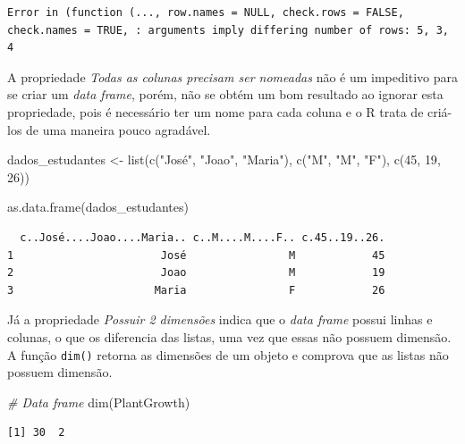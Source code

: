\documentclass[
  brazilian,
]{book}
\newenvironment{Shaded}{\begin{snugshade}}{\end{snugshade}}
\newcommand{\CommentTok}[1]{\textcolor[rgb]{0.56,0.35,0.01}{\textit{#1}}}
\newcommand{\DecValTok}[1]{\textcolor[rgb]{0.00,0.00,0.81}{#1}}
\newcommand{\FunctionTok}[1]{\textcolor[rgb]{0.00,0.00,0.00}{#1}}
\newcommand{\NormalTok}[1]{#1}
\newcommand{\OtherTok}[1]{\textcolor[rgb]{0.56,0.35,0.01}{#1}}
\newcommand{\StringTok}[1]{\textcolor[rgb]{0.31,0.60,0.02}{#1}}
\begin{document}
\begin{verbatim}
Error in (function (..., row.names = NULL, check.rows = FALSE, check.names = TRUE, : arguments imply differing number of rows: 5, 3, 4
\end{verbatim}

A propriedade \emph{Todas as colunas precisam ser nomeadas} não é um impeditivo para se criar um \emph{data frame}, porém, não se obtém um bom resultado ao ignorar esta propriedade, pois é necessário ter um nome para cada coluna e o R trata de criá-los de uma maneira pouco agradável.

\begin{Shaded}
\begin{Highlighting}[]
\NormalTok{dados\_estudantes }\OtherTok{\textless{}{-}} \FunctionTok{list}\NormalTok{(}\FunctionTok{c}\NormalTok{(}\StringTok{"José"}\NormalTok{, }\StringTok{"Joao"}\NormalTok{, }\StringTok{"Maria"}\NormalTok{),}
                         \FunctionTok{c}\NormalTok{(}\StringTok{"M"}\NormalTok{, }\StringTok{"M"}\NormalTok{, }\StringTok{"F"}\NormalTok{),}
                         \FunctionTok{c}\NormalTok{(}\DecValTok{45}\NormalTok{, }\DecValTok{19}\NormalTok{, }\DecValTok{26}\NormalTok{))}

\FunctionTok{as.data.frame}\NormalTok{(dados\_estudantes)}
\end{Highlighting}
\end{Shaded}

\begin{verbatim}
  c..José....Joao....Maria.. c..M....M....F.. c.45..19..26.
1                       José                M            45
2                       Joao                M            19
3                      Maria                F            26
\end{verbatim}

Já a propriedade \emph{Possuir 2 dimensões} indica que o \emph{data frame} possui linhas e colunas, o que os diferencia das listas, uma vez que essas não possuem dimensão. A função \texttt{dim()} retorna as dimensões de um objeto e comprova que as listas não possuem dimensão.

\begin{Shaded}
\begin{Highlighting}[]
\CommentTok{\# Data frame}
\FunctionTok{dim}\NormalTok{(PlantGrowth)}
\end{Highlighting}
\end{Shaded}

\begin{verbatim}
[1] 30  2
\end{verbatim}
\end{document}

